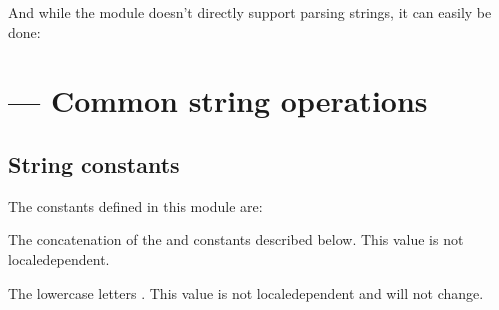 \documentclass[letterpaper,10pt,english]{sphinxmanual}
\begin{document}
And while the module doesn’t directly support parsing strings, it can easily be
done:

\begin{sphinxVerbatim}[commandchars=\\\{\}]
 
   \PYG{p}{[}\PYG{p}{]}
\end{sphinxVerbatim}


\chapter{ — Common string operations}
\label{\detokenize{string:module-string}}\label{\detokenize{string:string-common-string-operations}}\label{\detokenize{string::doc}}

\section{String constants}
\label{\detokenize{string:string-constants}}
The constants defined in this module are:

\begin{fulllineitems}
\label{\detokenize{string:string.ascii_letters}}
The concatenation of the {\hyperref[\detokenize{string:string.ascii_lowercase}]{}} and {\hyperref[\detokenize{string:string.ascii_uppercase}]{}}
constants described below.  This value is not locale\sphinxhyphen{}dependent.

\end{fulllineitems}


\begin{fulllineitems}
\label{\detokenize{string:string.ascii_lowercase}}
The lowercase letters .  This value is not
locale\sphinxhyphen{}dependent and will not change.

\end{fulllineitems}
\end{document}
